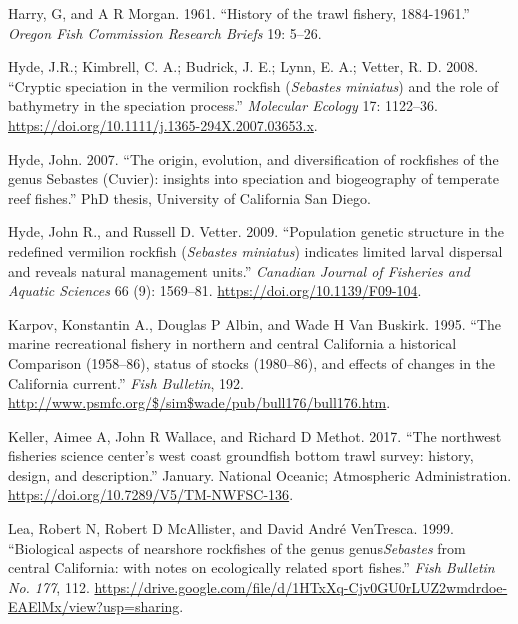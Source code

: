 \documentclass[11pt,
  english,
  a4paper,
]{article}
\newlength{\cslhangindent}
\newenvironment{CSLReferences}[2] %
 {%
  \setlength{\parindent}{0pt}
  \ifodd #1 \everypar{\setlength{\hangindent}{\cslhangindent}}\ignorespaces\fi
  \ifnum #2 > 0
  \setlength{\parskip}{#2\baselineskip}
  \fi
 }%
 {}
\begin{document}
\begin{CSLReferences}{1}{0}
\leavevmode{}%
Harry, G, and A R Morgan. 1961. {``{History of the trawl fishery, 1884-1961}.''} \emph{Oregon Fish Commission Research Briefs} 19: 5--26.

\leavevmode{}%
Hyde, J.R.; Kimbrell, C. A.; Budrick, J. E.; Lynn, E. A.; Vetter, R. D. 2008. {``{Cryptic speciation in the vermilion rockfish (\emph{Sebastes miniatus}) and the role of bathymetry in the speciation process}.''} \emph{Molecular Ecology} 17: 1122--36. \url{https://doi.org/10.1111/j.1365-294X.2007.03653.x}.

\leavevmode{}%
Hyde, John. 2007. {``{The origin, evolution, and diversification of rockfishes of the genus Sebastes (Cuvier): insights into speciation and biogeography of temperate reef fishes}.''} PhD thesis, University of California San Diego.

\leavevmode{}%
Hyde, John R., and Russell D. Vetter. 2009. {``{Population genetic structure in the redefined vermilion rockfish (\emph{Sebastes miniatus}) indicates limited larval dispersal and reveals natural management units}.''} \emph{Canadian Journal of Fisheries and Aquatic Sciences} 66 (9): 1569--81. \url{https://doi.org/10.1139/F09-104}.

\leavevmode{}%
Karpov, Konstantin A., Douglas P Albin, and Wade H Van Buskirk. 1995. {``{The marine recreational fishery in northern and central California a historical Comparison (1958--86), status of stocks (1980--86), and effects of changes in the California current}.''} \emph{Fish Bulletin}, 192. \url{http://www.psmfc.org/$/sim$wade/pub/bull176/bull176.htm}.

\leavevmode{}%
Keller, Aimee A, John R Wallace, and Richard D Methot. 2017. {``{The northwest fisheries science center's west coast groundfish bottom trawl survey: history, design, and description}.''} January. National Oceanic; Atmospheric Administration. \url{https://doi.org/10.7289/V5/TM-NWFSC-136}.

\leavevmode{}%
Lea, Robert N, Robert D McAllister, and David André VenTresca. 1999. {``{Biological aspects of nearshore rockfishes of the genus genus\emph{Sebastes} from central California: with notes on ecologically related sport fishes}.''} \emph{Fish Bulletin No. 177}, 112. \url{https://drive.google.com/file/d/1HTxXq-Cjv0GU0rLUZ2wmdrdoe-EAElMx/view?usp=sharing}.


\end{CSLReferences}
\end{document}
